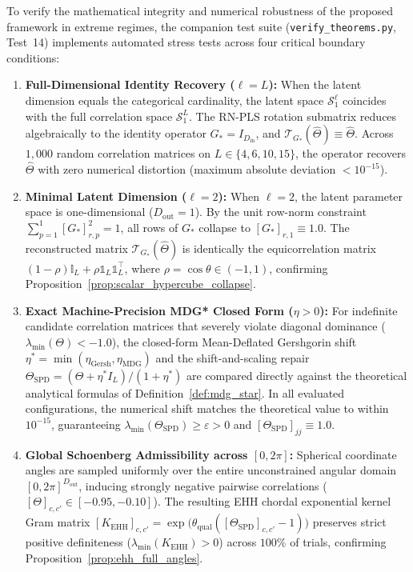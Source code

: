 \documentclass[default,sn-mathphys,Numbered]{sn-jnl}
\theoremstyle{thmstyleone}
\theoremstyle{thmstylethree}
\theoremstyle{thmstyletwo}
\newcommand{\inp}{\text{in}}
\newcommand{\outp}{\text{out}}
\begin{document}
\begin{appendices}
To verify the mathematical integrity and numerical robustness of the proposed framework in extreme regimes, the companion test suite (\texttt{verify\_theorems.py}, Test~14) implements automated stress tests across four critical boundary conditions:
\begin{enumerate}
    \item \textbf{Full-Dimensional Identity Recovery ($\ell = L$):} When the latent dimension equals the categorical cardinality, the latent space $\mathcal{S}_1^\ell$ coincides with the full correlation space $\mathcal{S}_1^L$. The RN-PLS rotation submatrix reduces algebraically to the identity operator $G_* = I_{D_{\inp}}$, and $\mathcal{T}_{G_*}(\hat{\Theta}) \equiv \hat{\Theta}$. Across $1{,}000$ random correlation matrices on $L \in \{4, 6, 10, 15\}$, the operator recovers $\hat{\Theta}$ with zero numerical distortion (maximum absolute deviation $< 10^{-15}$).
    \item \textbf{Minimal Latent Dimension ($\ell = 2$):} When $\ell = 2$, the latent parameter space is one-dimensional ($D_{\outp} = 1$). By the unit row-norm constraint $\sum_{p=1}^1 [G_*]_{r, p}^2 = 1$, all rows of $G_*$ collapse to $[G_*]_{r, 1} \equiv 1.0$. The reconstructed matrix $\mathcal{T}_{G_*}(\hat{\Theta})$ is identically the equicorrelation matrix $(1 - \rho)\mathbb{I}_L + \rho \mathds{1}_L \mathds{1}_L^\top$, where $\rho = \cos\theta \in (-1, 1)$, confirming Proposition~\ref{prop:scalar_hypercube_collapse}.
    \item \textbf{Exact Machine-Precision MDG* Closed Form ($\eta > 0$):} For indefinite candidate correlation matrices that severely violate diagonal dominance ($\lambda_{\min}(\Theta) < -1.0$), the closed-form Mean-Deflated Gershgorin shift $\eta^* = \min(\eta_{\mathrm{Gersh}}, \eta_{\mathrm{MDG}})$ and the shift-and-scaling repair $\Theta_{\mathrm{SPD}} = (\Theta + \eta^* I_L)/(1 + \eta^*)$ are compared directly against the theoretical analytical formulas of Definition~\ref{def:mdg_star}. In all evaluated configurations, the numerical shift matches the theoretical value to within $10^{-15}$, guaranteeing $\lambda_{\min}(\Theta_{\mathrm{SPD}}) \ge \varepsilon > 0$ and $[\Theta_{\mathrm{SPD}}]_{jj} \equiv 1.0$.
    \item \textbf{Global Schoenberg Admissibility across $[0, 2\pi]$:} Spherical coordinate angles are sampled uniformly over the entire unconstrained angular domain $[0, 2\pi]^{D_{\outp}}$, inducing strongly negative pairwise correlations ($[\Theta]_{c, c'} \in [-0.95, -0.10]$). The resulting EHH chordal exponential kernel Gram matrix $[K_{\mathrm{EHH}}]_{c, c'} = \exp\bigl(\theta_{\mathrm{qual}}([\Theta_{\mathrm{SPD}}]_{c, c'} - 1)\bigr)$ preserves strict positive definiteness ($\lambda_{\min}(K_{\mathrm{EHH}}) > 0$) across $100\%$ of trials, confirming Proposition~\ref{prop:ehh_full_angles}.
\end{enumerate}


\end{appendices}
\end{document}
